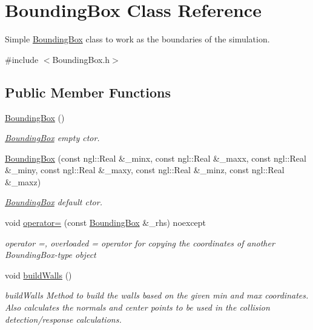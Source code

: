 \hypertarget{classBoundingBox}{}\section{Bounding\+Box Class Reference}
\label{classBoundingBox}


Simple \hyperlink{classBoundingBox}{Bounding\+Box} class to work as the boundaries of the simulation.  




{\ttfamily \#include $<$Bounding\+Box.\+h$>$}

\subsection*{Public Member Functions}
\begin{DoxyCompactItemize}
\item 
\hyperlink{classBoundingBox_a6e401c4da5839950f1f30c8b8c4d1208}{Bounding\+Box} ()\hypertarget{classBoundingBox_a6e401c4da5839950f1f30c8b8c4d1208}{}\label{classBoundingBox_a6e401c4da5839950f1f30c8b8c4d1208}

\begin{DoxyCompactList}\small\item\em \hyperlink{classBoundingBox}{Bounding\+Box} empty ctor. \end{DoxyCompactList}\item 
\hyperlink{classBoundingBox_a2a1c05a9eedd54d874b891de109ac067}{Bounding\+Box} (const ngl\+::\+Real \&\+\_\+minx, const ngl\+::\+Real \&\+\_\+maxx, const ngl\+::\+Real \&\+\_\+miny, const ngl\+::\+Real \&\+\_\+maxy, const ngl\+::\+Real \&\+\_\+minz, const ngl\+::\+Real \&\+\_\+maxz)
\begin{DoxyCompactList}\small\item\em \hyperlink{classBoundingBox}{Bounding\+Box} default ctor. \end{DoxyCompactList}\item 
void \hyperlink{classBoundingBox_aabf95166e9742f17e9fb4de0feb116fd}{operator=} (const \hyperlink{classBoundingBox}{Bounding\+Box} \&\+\_\+rhs) noexcept
\begin{DoxyCompactList}\small\item\em operator =, overloaded = operator for copying the coordinates of another Bounding\+Box-\/type object \end{DoxyCompactList}\item 
void \hyperlink{classBoundingBox_ae71df3372b851b8f5afd770d605c0f23}{build\+Walls} ()\hypertarget{classBoundingBox_ae71df3372b851b8f5afd770d605c0f23}{}\label{classBoundingBox_ae71df3372b851b8f5afd770d605c0f23}

\begin{DoxyCompactList}\small\item\em build\+Walls Method to build the walls based on the given min and max coordinates. Also calculates the normals and center points to be used in the collision detection/response calculations. \end{DoxyCompactList}\end{DoxyCompactItemize}
